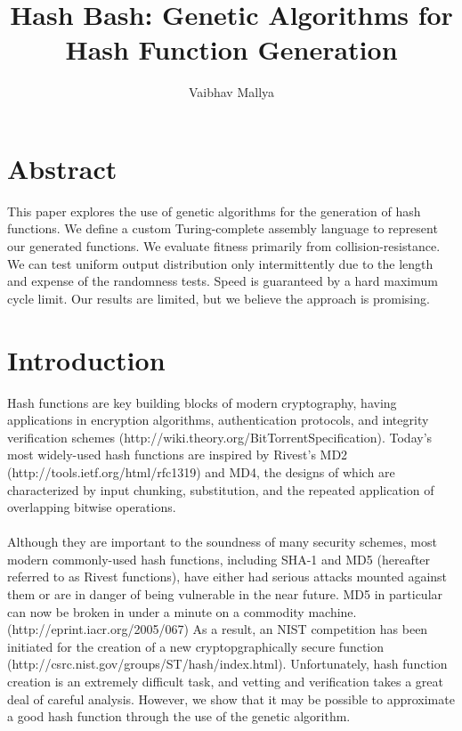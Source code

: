 \documentclass{article}
\begin{document}
\title{Hash Bash: Genetic Algorithms for Hash Function Generation}
\author{Vaibhav Mallya}
\maketitle
\section{Abstract}


This paper explores the use of genetic algorithms for the generation of hash functions. We define a custom Turing-complete assembly language to represent our generated functions. We evaluate fitness primarily from collision-resistance. We can test uniform output distribution only intermittently due to the length and expense of the randomness tests. Speed is guaranteed by a hard maximum cycle limit. Our results are limited, but we believe the approach is promising.

\section{Introduction}
Hash functions are key building blocks of modern cryptography, having applications in encryption algorithms, authentication protocols, and integrity verification schemes (http://wiki.theory.org/BitTorrentSpecification). Today's most widely-used hash functions are inspired by Rivest's MD2 (http://tools.ietf.org/html/rfc1319) and MD4, the designs of which are characterized by input chunking, substitution, and the repeated application of overlapping bitwise operations.

\paragraph{}
Although they are important to the soundness of many security schemes, most modern commonly-used hash functions, including SHA-1 and MD5 (hereafter referred to as Rivest functions), have either had serious attacks mounted against them or are in danger of being vulnerable in the near future.
MD5 in particular can now be broken in under a minute on a commodity machine. (http://eprint.iacr.org/2005/067) As a result, an NIST competition has been initiated for the creation of a new cryptopgraphically secure function (http://csrc.nist.gov/groups/ST/hash/index.html). Unfortunately, hash function creation is an extremely difficult task, and vetting and verification takes a great deal of careful analysis.
However, we show that it may be possible to approximate a good hash function through the use of the genetic algorithm.
\end{document}

